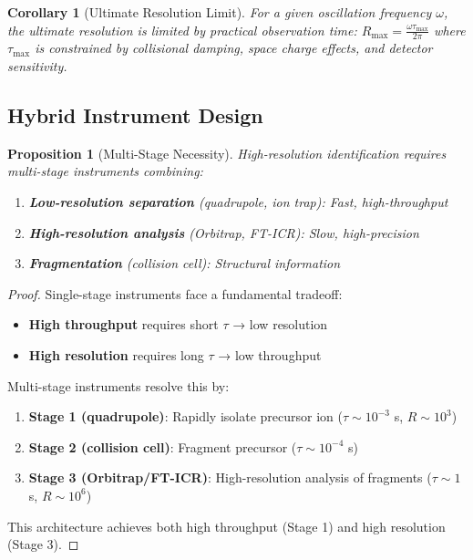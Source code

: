 \documentclass[twocolumn,10pt]{article}
\newtheorem{proposition}[theorem]{Proposition}
\newtheorem{corollary}[theorem]{Corollary}
\begin{document}
\begin{corollary}[Ultimate Resolution Limit]
\label{cor:ultimate_limit}
For a given oscillation frequency $\omega$, the ultimate resolution is limited by practical observation time:
$
R_{\max} = \frac{\omega \tau_{\max}}{2\pi}
$
where $\tau_{\max}$ is constrained by collisional damping, space charge effects, and detector sensitivity.
\end{corollary}

\subsection{Hybrid Instrument Design}

\begin{proposition}[Multi-Stage Necessity]
\label{prop:multistage}
High-resolution identification requires multi-stage instruments combining:
\begin{enumerate}
    \item \textbf{Low-resolution separation} (quadrupole, ion trap): Fast, high-throughput
    \item \textbf{High-resolution analysis} (Orbitrap, FT-ICR): Slow, high-precision
    \item \textbf{Fragmentation} (collision cell): Structural information
\end{enumerate}
\end{proposition}

\begin{proof}
Single-stage instruments face a fundamental tradeoff:
\begin{itemize}
    \item \textbf{High throughput} requires short $\tau$ → low resolution
    \item \textbf{High resolution} requires long $\tau$ → low throughput
\end{itemize}

Multi-stage instruments resolve this by:
\begin{enumerate}
    \item \textbf{Stage 1 (quadrupole)}: Rapidly isolate precursor ion ($\tau \sim 10^{-3}$ s, $R \sim 10^3$)
    \item \textbf{Stage 2 (collision cell)}: Fragment precursor ($\tau \sim 10^{-4}$ s)
    \item \textbf{Stage 3 (Orbitrap/FT-ICR)}: High-resolution analysis of fragments ($\tau \sim 1$ s, $R \sim 10^6$)
\end{enumerate}

This architecture achieves both high throughput (Stage 1) and high resolution (Stage 3).
\end{proof}
\end{document}
